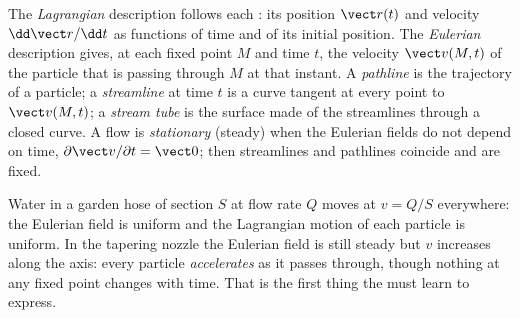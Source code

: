 \begin{definition}\label{def:b2:fluid-kinematics:euler}
The \emph{Lagrangian} description follows each : its
position $\vect r(t)$ and velocity $\dd\vect r/\dd t$ as functions of time
and of its initial position. The \emph{Eulerian} description gives, at
each fixed point $M$ and time $t$, the velocity $\vect v(M, t)$ of the
particle that is passing through $M$ at that instant. A \emph{pathline}
is the trajectory of a particle; a \emph{streamline} at time $t$ is a
curve tangent at every point to $\vect v(M, t)$; a \emph{stream tube} is
the surface made of the streamlines through a closed curve. A flow is
\emph{stationary} (steady) when the Eulerian fields do not depend on
time, $\partial\vect v/\partial t = \vect 0$; then streamlines and pathlines
coincide and are fixed.
\end{definition}

\begin{example}\label{ex:b2:fluid-kinematics:hose}
Water in a garden hose of section $S$ at flow rate $Q$ moves at $v = Q/S$
everywhere: the Eulerian field is uniform and the Lagrangian motion of
each particle is uniform. In the tapering nozzle the Eulerian field is
still steady but $v$ increases along the axis: every particle
\emph{accelerates} as it passes through, though nothing at any fixed
point changes with time. That is the first thing the  must learn to express.
\end{example}


